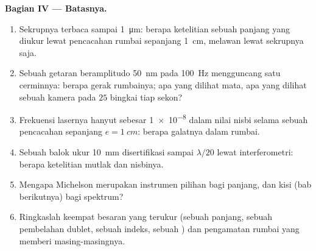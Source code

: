 \begin{problem}
\medskip
\noindent\textbf{Bagian IV --- Batasnya.}
\begin{enumerate}[resume]
  \item Sekrupnya terbaca sampai \qty{1}{\micro m}: berapa ketelitian sebuah panjang
        yang diukur lewat pencacahan rumbai sepanjang \qty{1}{cm}, melawan lewat sekrupnya
        saja.
  \item Sebuah getaran beramplitudo \qty{50}{nm} pada \qty{100}{Hz} mengguncang satu
        cerminnya: berapa gerak rumbainya; apa yang dilihat mata, apa yang dilihat sebuah
        kamera pada $25$ bingkai tiap sekon?
  \item Frekuensi lasernya hanyut sebesar \qty{1e-8}{} dalam nilai nisbi
        selama sebuah pencacahan sepanjang $e = \qty{1}{cm}$: berapa galatnya dalam rumbai.
  \item Sebuah balok ukur \qty{10}{mm} disertifikasi sampai $\lambda/20$ lewat
        interferometri: berapa ketelitian mutlak dan nisbinya.
  \item Mengapa Michelson merupakan instrumen pilihan bagi panjang, dan
        kisi (bab berikutnya) bagi spektrum?
  \item Ringkaslah keempat besaran yang terukur (sebuah panjang, sebuah pembelahan
        dublet, sebuah indeks, sebuah ) dan pengamatan
        rumbai yang memberi masing-masingnya.
\end{enumerate}
\end{problem}

